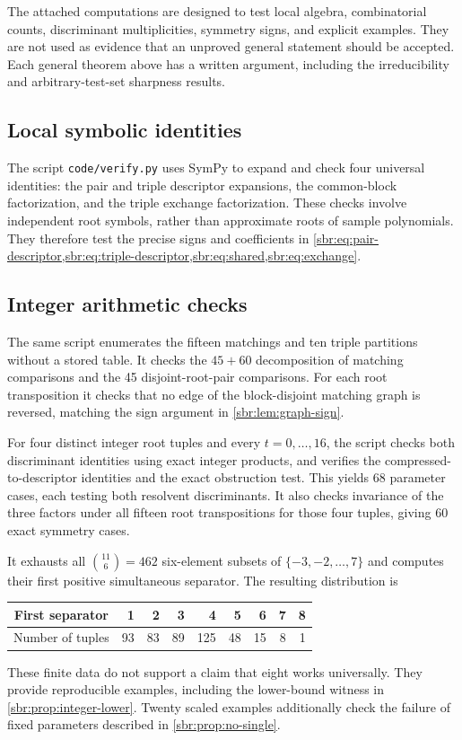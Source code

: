 \documentclass[11pt,letterpaper]{article}
\numberwithin{equation}{section}
\theoremstyle{definition}
\theoremstyle{remark}
\newcommand{\src}[1]{\texttt{\nolinkurl{#1}}}
\begin{document}
The attached computations are designed to test local algebra, combinatorial
counts, discriminant multiplicities, symmetry signs, and explicit examples.
They are not used as evidence that an unproved general statement should be
accepted. Each general theorem above has a written argument, including the
irreducibility and arbitrary-test-set sharpness results.

\subsection{Local symbolic identities}

The script \src{code/verify.py} uses SymPy to expand and check four universal
identities: the pair and triple descriptor expansions, the common-block
factorization, and the triple exchange factorization. These checks involve
independent root symbols, rather than approximate roots of sample
polynomials. They therefore test the precise signs and coefficients in
\cref{sbr:eq:pair-descriptor,sbr:eq:triple-descriptor,sbr:eq:shared,sbr:eq:exchange}.

\subsection{Integer arithmetic checks}

The same script enumerates the fifteen matchings and ten triple partitions
without a stored table. It checks the $45+60$ decomposition of matching
comparisons and the 45 disjoint-root-pair comparisons. For each root
transposition it checks that no edge of the block-disjoint matching graph
is reversed, matching the sign argument in \cref{sbr:lem:graph-sign}.

For four distinct integer root tuples and every $t=0,\ldots,16$, the
script checks both discriminant identities using exact integer products,
and verifies the compressed-to-descriptor identities and the exact
obstruction test. This yields 68 parameter cases, each testing both
resolvent discriminants. It also checks invariance of the three factors
under all fifteen root transpositions for those four tuples, giving
60 exact symmetry cases.

It exhausts all $\binom{11}{6}=462$ six-element subsets of
$\{-3,-2,\ldots,7\}$ and computes their first positive simultaneous
separator. The resulting distribution is
\begin{center}
\begin{tabular}{c*{8}{r}}
\toprule
First separator&1&2&3&4&5&6&7&8\\
\midrule
Number of tuples&93&83&89&125&48&15&8&1\\
\bottomrule
\end{tabular}
\end{center}
These finite data do not support a claim that eight works universally.
They provide reproducible examples, including the lower-bound witness in
\cref{sbr:prop:integer-lower}. Twenty scaled examples additionally check the
failure of fixed parameters described in \cref{sbr:prop:no-single}.
\end{document}
